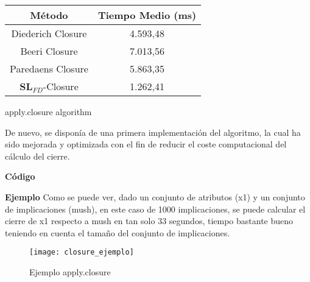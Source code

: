\begin{center}
    \begin{tabular}{c c}
        \hline
        M\'etodo & Tiempo Medio (ms) \\
        \hline
        Diederich Closure & 4.593,48 \\   
        Beeri Closure & 7.013,56 \\   
        Paredaens Closure & 5.863,35 \\  
        \(\textbf{SL}_{FD}\)-Closure & 1.262,41 \\  
    \end{tabular}
\end{center}

\newpage

\IncMargin{1em}
\begin{algorithm}[h]
    \SetAlgoLined
    \LinesNumbered
    \DontPrintSemicolon
    \caption{apply.closure algorithm}\label{alg:2}
\end{algorithm}\DecMargin{1em}
\bigskip

De nuevo, se dispon\'ia de una primera implementaci\'on del algoritmo, la cual ha sido mejorada y optimizada con el fin de reducir el coste computacional del c\'alculo del cierre.



\newpage
\textbf{C\'odigo} 

\textbf{Ejemplo}
Como se puede ver, dado un conjunto de atributos (x1) y un conjunto de implicaciones (mush), en este caso de 1000 implicaciones, se puede calcular el cierre de x1 respecto a mush en tan solo 33 segundos, tiempo bastante bueno teniendo en cuenta el tama\~no del conjunto de implicaciones. \\ 
\begin{figure}[h]
    \centering
    \texttt{[image: closure\_ejemplo]}
    \caption{Ejemplo apply.closure}
    \label{fig:closure_ejemplo}
\end{figure} 

